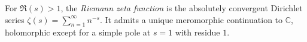 
For $\Re(s)>1$, the \emph{Riemann zeta function} is the absolutely convergent Dirichlet series $\zeta(s)=\sum_{n=1}^\infty n^{-s}$. It admits a unique meromorphic continuation to $\mathbb C$, holomorphic except for a simple pole at $s=1$ with residue $1$.
